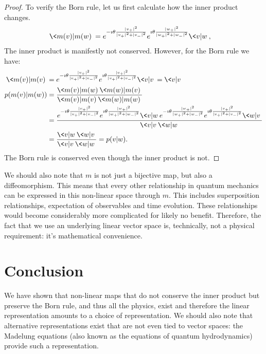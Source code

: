 \documentclass{techbrief}
\begin{document}
\begin{proof}
To verify the Born rule, let us first calculate how the inner product changes.
\begin{equation}
	\begin{aligned}
		\<m(v) | m(w) \> &= e^{-\imath \theta \frac{|v_{+}|^2}{|v_{+}|^2+|v_{-}|^2}} e^{\imath \theta \frac{|w_{+}|^2}{|w_{+}|^2+|w_{-}|^2}} \< v | w \>,
	\end{aligned}
\end{equation}
The inner product is manifestly not conserved. However, for the Born rule we have:
\begin{equation}
	\begin{aligned}
		\<m(v) | m(v) \> &= e^{-\imath \theta \frac{|v_{+}|^2}{|v_{+}|^2+|v_{-}|^2}} e^{\imath \theta \frac{|v_{+}|^2}{|v_{+}|^2+|v_{-}|^2}} \< v | v \> = \< v | v \> \\
		p(m(v)|m(w)) &= \frac{\< m(v) | m(w) \>\< m(w) | m(v) \>}{\< m(v) | m(v) \>\< m(w) | m(w) \>} \\
		&= \frac{e^{-\imath \theta \frac{|v_{+}|^2}{|v_{+}|^2+|v_{-}|^2}} e^{\imath \theta \frac{|w_{+}|^2}{|w_{+}|^2+|w_{-}|^2}} \< v | w \> e^{-\imath \theta \frac{|w_{+}|^2}{|w_{+}|^2+|w_{-}|^2}}e^{\imath \theta \frac{|v_{+}|^2}{|v_{+}|^2+|v_{-}|^2}}  \< w | v \>}{\< v | v \>\< w | w \>} \\
		&= \frac{\< v | w \>\< w | v \>}{\< v | v \>\< w | w \>} = p(v|w).
	\end{aligned}
\end{equation}
The Born rule is conserved even though the inner product is not.
\end{proof}

\begin{remark}
We should also note that $m$ is not just a bijective map, but also a diffeomorphism. This means that every other relationship in quantum mechanics can be expressed in this non-linear space through $m$. This includes superposition relationships, expectation of observables and time evolution. These relationships would become considerably more complicated for likely no benefit. Therefore, the fact that we use an underlying linear vector space is, technically, not a physical requirement: it's mathematical convenience.
\end{remark}

\section{Conclusion}

We have shown that non-linear maps that do not conserve the inner product but preserve the Born rule, and thus all the physics, exist and therefore the linear representation amounts to a choice of representation. We should also note that alternative representations exist that are not even tied to vector spaces: the Madelung equations (also known as the equations of quantum hydrodynamics) provide such a representation.
\end{document}
